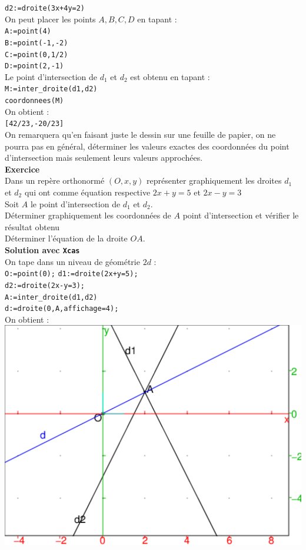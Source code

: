 \documentclass[a4paper,11pt]{book}
\begin{document}
{\tt d2:=droite(3x+4y=2)}\\
On peut placer les points $A,B,C,D$ en tapant :\\
{\tt A:=point(4)}\\
{\tt B:=point(-1,-2)}\\
{\tt C:=point(0,1/2)}\\
{\tt D:=point(2,-1)}\\
Le point d'intersection de $d_1$ et $d_2$ est obtenu en tapant :\\
{\tt M:=inter\_droite(d1,d2)}\\
{\tt coordonnees(M)}\\
On obtient :\\
{\tt [42/23,-20/23]}\\
On remarquera qu'en faisant juste le dessin sur une feuille de papier, on ne 
pourra pas en g\'en\'eral, d\'eterminer les valeurs exactes des coordonn\'ees 
du point d'intersection mais seulement leurs valeurs approch\'ees.\\
{\bf Exercice}\\
Dans un rep\`ere orthonorm\'e $(O,x,y)$ repr\'esenter graphiquement les 
droites $d_1$ et $d_2$ qui ont comme \'equation respective 
$2x+y=5$ et $2x-y=3$\\
Soit $A$ le point d'intersection de $d_1$ et $d_2$.\\
 D\'eterminer graphiquement les coordonn\'ees de $A$ point d'intersection 
et v\'erifier le r\'esultat obtenu\\
 D\'eterminer l'\'equation de la droite $OA$.\\
{\bf Solution avec {\tt Xcas}}\\
On tape dans un niveau de g\'eom\'etrie $2d$ :\\
{\tt O:=point(0);}
{\tt d1:=droite(2x+y=5);}\\
{\tt d2:=droite(2x-y=3);}\\
{\tt A:=inter\_droite(d1,d2)}\\
{\tt d:=droite(0,A,affichage=4);}\\
On obtient : \\
\includegraphics[width=\textwidth]{systgraph2}\\
\end{document}
